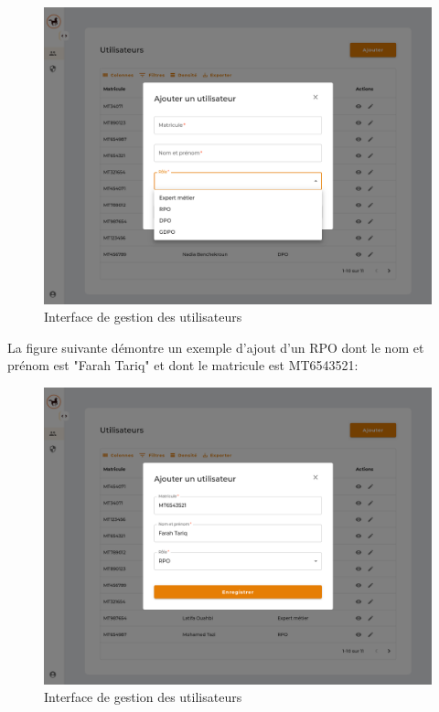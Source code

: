 \begin{figure}[H]
    \centering
    \includegraphics[width=.9\textwidth]{images/guis/utilisateurs/form/form-role-options.png}
    \caption{Interface de gestion des utilisateurs}
\end{figure}

\noindent La figure suivante démontre un exemple d'ajout d'un RPO dont le nom et prénom est "Farah Tariq" et dont le matricule est MT6543521: \\

\begin{figure}[H]
    \centering
    \includegraphics[width=\textwidth]{images/guis/utilisateurs/form/form-filled.png}
    \caption{Interface de gestion des utilisateurs}
\end{figure}

